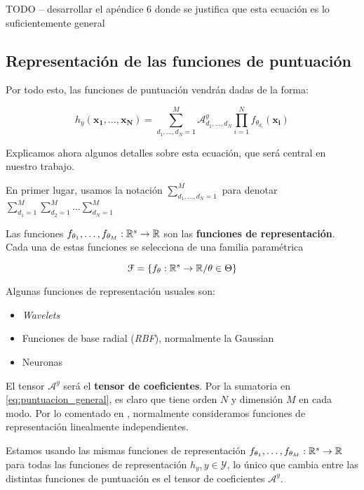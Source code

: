 TODO -- desarrollar el apéndice 6 donde se justifica que esta ecuación es lo suficientemente general

\subsection{Representación de las funciones de puntuación} \label{sec:repr_funciones_puntuacion}

Por todo esto, las funciones de puntuación vendrán dadas de la forma:

\begin{equation} \label{eq:puntuacion_general}
    h_y(\mathbf{x_1}, \ldots, \mathbf{x_N}) = \sum_{d_1, \ldots, d_N = 1}^{M} \mathcal{A}^y_{d_1, \ldots, d_N} \prod_{i = 1}^N f_{\theta_{d_i}}(\mathbf{x_i})
\end{equation}

Explicamos ahora algunos detalles sobre esta ecuación, que será central en nuestro trabajo.

En primer lugar, usamos la notación $\sum_{d_1, \ldots, d_N = 1}^{M}$ para denotar $\sum_{d_1 = 1}^{M} \sum_{d_2 = 1}^{M} \ldots \sum_{d_N = 1}^{M}$

Las funciones $f_{\theta_1}, \ldots, f_{\theta_M}: \mathbb{R}^s \to \mathbb{R}$ son las \textbf{funciones de representación}. Cada una de estas funciones se selecciona de una familia paramétrica

$$\mathcal{F} = \{ f_{\theta}: \mathbb{R}^s \to \mathbb{R} / \theta \in \Theta \}$$

Algunas funciones de representación usuales son:

\begin{itemize}
    \item \textit{Wavelets}
    \item Funciones de base radial (\textit{RBF}), normalmente la Gaussian
    \item Neuronas
\end{itemize}

El tensor $\mathcal{A}^y$ será el \textbf{tensor de coeficientes}. Por la sumatoria en \eqref{eq:puntuacion_general}, es claro que tiene orden $N$ y dimensión $M$ en cada modo. Por lo comentado en , normalmente consideramos funciones de representación linealmente independientes.

Estamos usando las mismas funciones de representación $f_{\theta_1}, \ldots, f_{\theta_M}: \mathbb{R}^s \to \mathbb{R}$ para todas las funciones de representación $h_y, y \in \mathcal{Y}$, lo único que cambia entre las distintas funciones de puntuación es el tensor de coeficientes $\mathcal{A}^y$.

